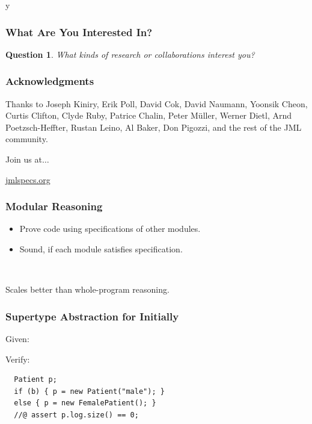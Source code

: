 \if y\MAKEHANDOUTS \documentclass[t,compress,landscape,handout]{beamer}
\newtheorem*{question}{Question}
\begin{document}
\begin{frame}
\frametitle{What Are You Interested In?}

\begin{question}
What kinds of research or collaborations interest you?
\end{question}
\end{frame}


\begin{frame}
\frametitle{Acknowledgments}
Thanks to Joseph Kiniry, Erik Poll, David Cok, David Naumann, 
Yoonsik Cheon, Curtis Clifton, Clyde Ruby, Patrice Chalin,
Peter M\"{u}ller, Werner Dietl,
Arnd Poetzsch-Heffter,
Rustan Leino, 
Al Baker, Don Pigozzi,
and
the rest of the JML community.

Join us at$\ldots$

\begin{center}
\href{http://www.jmlspecs.org/}{jmlspecs.org}
\end{center}
\end{frame}


\appendix



\begin{frame}
\frametitle{Modular Reasoning}
\begin{itemize}
\item
Prove code using specifications of other modules.

\item
Sound, if each module satisfies specification.
\end{itemize}

~ 

Scales better than whole-program reasoning.
\end{frame}

\begin{frame}[fragile]
\frametitle{Supertype Abstraction for Initially}
Given:


Verify:
\begin{lstlisting}
  Patient p;
  if (b) { p = new Patient("male"); }
  else { p = new FemalePatient(); }
  //@ assert p.log.size() == 0;
\end{lstlisting}
\end{frame}
\end{document}
